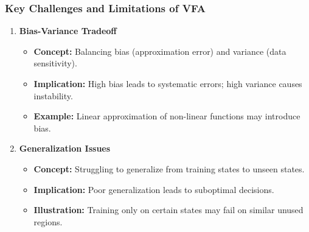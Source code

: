 \documentclass[aspectratio=169]{beamer}
\begin{document}
\begin{frame}[fragile]
  \frametitle{Key Challenges and Limitations of VFA}
  \begin{enumerate}
    \item \textbf{Bias-Variance Tradeoff}
      \begin{itemize}
        \item \textbf{Concept:} Balancing bias (approximation error) and variance (data sensitivity).
        \item \textbf{Implication:} High bias leads to systematic errors; high variance causes instability.
        \item \textbf{Example:} Linear approximation of non-linear functions may introduce bias.
      \end{itemize}
    
    \item \textbf{Generalization Issues}
      \begin{itemize}
        \item \textbf{Concept:} Struggling to generalize from training states to unseen states.
        \item \textbf{Implication:} Poor generalization leads to suboptimal decisions.
        \item \textbf{Illustration:} Training only on certain states may fail on similar unused regions.
      \end{itemize}
  \end{enumerate}
\end{frame}
\end{document}

